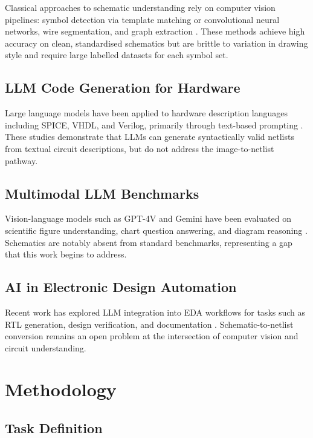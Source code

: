 \documentclass[conference]{IEEEtran}
\begin{document}
Classical approaches to schematic understanding rely on computer vision pipelines: symbol detection via template matching or convolutional neural networks, wire segmentation, and graph extraction \cite{b1}\cite{b5}. These methods achieve high accuracy on clean, standardised schematics but are brittle to variation in drawing style and require large labelled datasets for each symbol set.

\subsection{LLM Code Generation for Hardware}

Large language models have been applied to hardware description languages including SPICE, VHDL, and Verilog, primarily through text-based prompting \cite{b4}. These studies demonstrate that LLMs can generate syntactically valid netlists from textual circuit descriptions, but do not address the image-to-netlist pathway.

\subsection{Multimodal LLM Benchmarks}

Vision-language models such as GPT-4V and Gemini have been evaluated on scientific figure understanding, chart question answering, and diagram reasoning \cite{b7}\cite{b2}. Schematics are notably absent from standard benchmarks, representing a gap that this work begins to address.

\subsection{AI in Electronic Design Automation}

Recent work has explored LLM integration into EDA workflows for tasks such as RTL generation, design verification, and documentation \cite{b5}. Schematic-to-netlist conversion remains an open problem at the intersection of computer vision and circuit understanding.

\section{Methodology}

\subsection{Task Definition}
\end{document}
